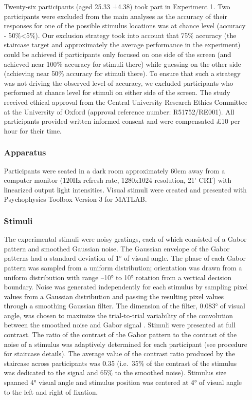 \documentclass[a4paper, nobind]{templates/ociamthesis}
\begin{document}
Twenty-six participants (aged 25.33 ±4.38) took part in Experiment 1. Two participants were excluded from the main analyses as the accuracy of their responses for one of the possible stimulus locations was at chance level (\textbar accuracy - 50\%\textbar\textless5\%). Our exclusion strategy took into account that 75\% accuracy (the staircase target and approximately the average performance in the experiment) could be achieved if participants only focused on one side of the screen (and achieved near 100\% accuracy for stimuli there) while guessing on the other side (achieving near 50\% accuracy for stimuli there). To ensure that such a strategy was not driving the observed level of accuracy, we excluded participants who performed at chance level for stimuli on either side of the screen. The study received ethical approval from the Central University Research Ethics Committee at the University of Oxford (approval reference number: R51752/RE001). All participants provided written informed consent and were compensated £10 per hour for their time.

\hypertarget{apparatus}{%
\subsubsection{Apparatus}\label{apparatus}}

Participants were seated in a dark room approximately 60cm away from a computer monitor (120Hz refresh rate, 1280x1024 resolution, 21' CRT) with linearized output light intensities. Visual stimuli were created and presented with Psychophysics Toolbox Version 3 \autocite[PsychToolbox-3,][]{brainard1997} for MATLAB.

\hypertarget{stimuli}{%
\subsubsection{Stimuli}\label{stimuli}}

The experimental stimuli were noisy gratings, each of which consisted of a Gabor pattern and smoothed Gaussian noise. The Gaussian envelope of the Gabor patterns had a standard deviation of 1° of visual angle. The phase of each Gabor pattern was sampled from a uniform distribution; orientation was drawn from a uniform distribution with range --10° to 10° rotation from a vertical decision boundary. Noise was generated independently for each stimulus by sampling pixel values from a Gaussian distribution and passing the resulting pixel values through a smoothing Gaussian filter. The dimension of the filter, 0.083° of visual angle, was chosen to maximize the trial-to-trial variability of the convolution between the smoothed noise and Gabor signal \autocite{wyart2012}. Stimuli were presented at full contrast. The ratio of the contrast of the Gabor pattern to the contrast of the noise of a stimulus was adaptively determined for each participant (see procedure for staircase details). The average value of the contrast ratio produced by the staircase across participants was 0.35 (i.e.~35\% of the contrast of the stimulus was dedicated to the signal and 65\% to the smoothed noise). Stimulus size spanned 4° visual angle and stimulus position was centered at 4° of visual angle to the left and right of fixation.
\end{document}
